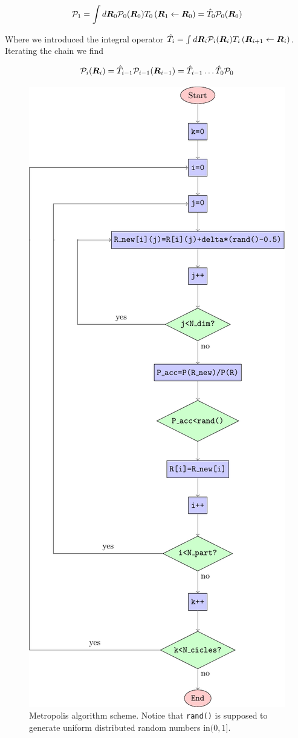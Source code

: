 \begin{equation}
  \mathcal{P}_1=\int d\bm{R}_0 \mathcal{P}_0(\bm{R}_0)T_{0}\left(\bm{R}_{1}\leftarrow \bm{R}_{0}\right)=\hat{T}_0\mathcal{P}_0(\bm{R}_0)
\end{equation}

Where we introduced the integral operator $\hat{T}_i =\int d\bm{R}_i \mathcal{P}_i(\bm{R}_i)T_{i}\left(\bm{R}_{i+1}\leftarrow \bm{R}_{i}\right)$.
Iterating the chain we find

\begin{equation}
  \mathcal{P}_i(\bm{R}_i)=\hat{T}_{i-1}\mathcal{P}_{i-1}(\bm{R}_{i-1})=\hat{T}_{i-1}\dots\hat{T}_0\mathcal{P}_0
\end{equation}

\begin{figure}
  \centering
  \includegraphics[width=.6\textwidth]{Schemes/metropolis.pdf}
  \caption[Metropolis algorithm scheme.]{Metropolis algorithm scheme. Notice that \texttt{rand()} is supposed to generate uniform distributed random numbers in$(0,1]$.}
  \label{Metropolis}
\end{figure}

